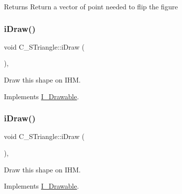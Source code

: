 \begin{DoxyReturn}{Returns}
Return a vector of point needed to flip the figure 
\end{DoxyReturn}
\mbox{\label{classC__STriangle_a7297480fe52b58654d81e2e70fbb237d}} 
\subsubsection{\texorpdfstring{i\+Draw()}{iDraw()}\hspace{0.1cm}{\footnotesize\ttfamily [1/4]}}
{\footnotesize\ttfamily void C\+\_\+\+S\+Triangle\+::i\+Draw (\begin{DoxyParamCaption}{ }\end{DoxyParamCaption})\hspace{0.3cm}{\ttfamily [override]}, {\ttfamily [virtual]}}



Draw this shape on I\+HM. 



Implements \hyperlink{classI__Drawable_ae24c65000977a805f52ce032321cd86f}{I\+\_\+\+Drawable}.

\mbox{\label{classC__STriangle_a7297480fe52b58654d81e2e70fbb237d}} 
\subsubsection{\texorpdfstring{i\+Draw()}{iDraw()}\hspace{0.1cm}{\footnotesize\ttfamily [2/4]}}
{\footnotesize\ttfamily void C\+\_\+\+S\+Triangle\+::i\+Draw (\begin{DoxyParamCaption}{ }\end{DoxyParamCaption})\hspace{0.3cm}{\ttfamily [override]}, {\ttfamily [virtual]}}



Draw this shape on I\+HM. 



Implements \hyperlink{classI__Drawable_ae24c65000977a805f52ce032321cd86f}{I\+\_\+\+Drawable}.

\mbox{\label{classC__STriangle_ad003b932a467de60b814d897fda38390}} 
